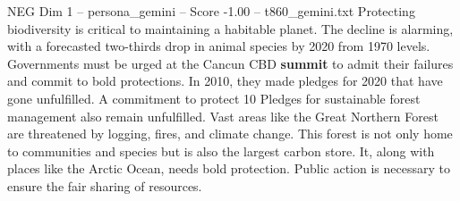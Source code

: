 \begin{textsample}{NEG Dim 1 – persona\_gemini – Score -1.00 – t860\_gemini.txt}  \label{ex:f1_neg_015}
Protecting biodiversity is critical to maintaining a habitable planet.
The decline is alarming, with a forecasted two-thirds drop in animal species by 2020 from 1970 levels.
Governments must be urged at the Cancun CBD \textbf{summit} to admit their failures and commit to bold protections.
In 2010, they made pledges for 2020 that have gone unfulfilled.
A commitment to protect 10 %
Pledges for sustainable forest management also remain unfulfilled.
Vast areas like the Great Northern Forest are threatened by logging, fires, and climate change.
This forest is not only home to communities and species but is also the largest carbon store.
It, along with places like the Arctic Ocean, needs bold protection.
Public action is necessary to ensure the fair sharing of resources.

\end{textsample}
